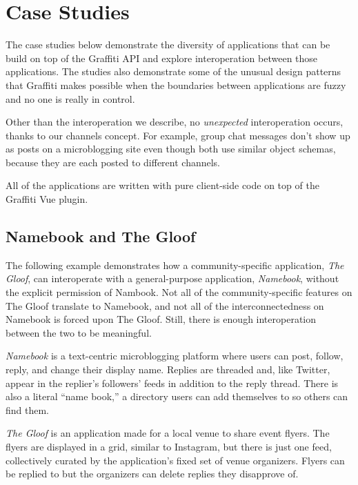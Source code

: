 \section{Case Studies}
\label{case-studies}


The case studies below demonstrate the diversity of applications
that can be build on top of the Graffiti API and explore interoperation
between those applications.
The studies also demonstrate some of the unusual design patterns that
Graffiti makes possible when the boundaries between applications
are fuzzy and no one is really in control.

Other than the interoperation we describe, no \emph{unexpected}
interoperation occurs, thanks to our channels concept.
For example, group chat messages don't show up as posts on
a microblogging site even though both use similar object schemas,
because they are each posted to different channels.

All of the applications are written with pure client-side code on
top of the Graffiti Vue plugin.

\subsection{Namebook and The Gloof}

The following example demonstrates how a community-specific application,
\emph{The Gloof}, can interoperate with a general-purpose application, \emph{Namebook},
without the explicit permission of Nambook.
Not all of the community-specific features on The Gloof
translate to Namebook, and not all of the interconnectedness on Namebook
is forced upon The Gloof.
Still, there is enough interoperation between the two to be meaningful.

\emph{Namebook} is a text-centric microblogging platform
where users can post, follow, reply, and change their display name.
Replies are threaded and, like Twitter, appear in the replier's followers' feeds
in addition to the reply thread.
There is also a literal ``name book,'' a directory
users can add themselves to so others can find them.

\emph{The Gloof} is an application made for a local
venue to share event flyers.
The flyers are displayed in a grid, similar to Instagram,
but there is just one feed, collectively curated by
the application's fixed set of venue organizers.
Flyers can be replied to but the organizers can delete replies they disapprove of.

